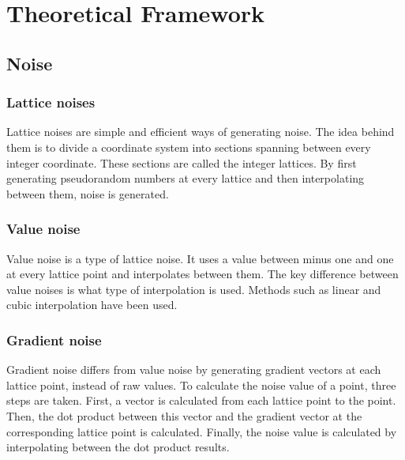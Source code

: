 \section{Theoretical Framework}
	\subsection{Noise}
		\subsubsection{Lattice noises}
		Lattice noises are simple and efficient ways of generating noise\cite{TexturingModeling}. The idea behind them is to divide a coordinate system into sections spanning between every integer coordinate. These sections are called the integer lattices. By first generating pseudorandom numbers at every lattice and then interpolating between them, noise is generated.
		
		\subsubsection{Value noise}
		Value noise is a type of lattice noise. It uses a value between minus one and one at every lattice point and interpolates between them. The key difference between value noises is what type of interpolation is used. Methods such as linear and cubic interpolation have been used\cite{TexturingModeling}.
		
		\subsubsection{Gradient noise}
		Gradient noise differs from value noise by generating gradient vectors at each lattice point, instead of raw values. To calculate the noise value of a point, three steps are taken. First, a vector is calculated from each lattice point to the point.  Then, the dot product between this vector and the gradient vector at the corresponding lattice point is calculated. Finally, the noise value is calculated by interpolating between the dot product results.
		
